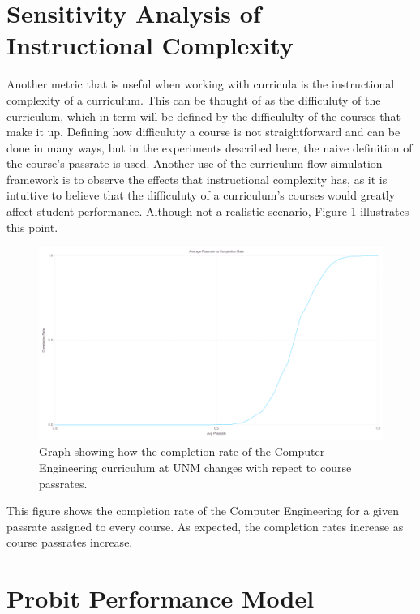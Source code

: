 \documentclass[botnum, fleqn]{unmeethesis}
\begin{document}
\section{Sensitivity Analysis of Instructional Complexity}

Another metric that is useful when working with curricula is the instructional complexity of a curriculum. This can be thought of as the difficuluty of the curriculum, which in term will be defined by the difficululty of the courses that make it up. Defining how difficuluty a course is not straightforward and can be done in many ways, but in the experiments described here, the naive definition of the course's passrate is used. Another use of the curriculum flow simulation framework is to observe the effects that instructional complexity has, as it is intuitive to believe that the difficuluty of a curriculum's courses would greatly affect student performance. Although not a realistic scenario, Figure \ref{fig:instructional} illustrates this point.

\begin{figure}[h!]
\centerline{\includegraphics[scale=0.2]{./figures/instructional.png}}
\caption{Graph showing how the completion rate of the Computer Engineering curriculum at UNM changes with repect to course passrates.} 
\label{fig:instructional}
\end{figure}

This figure shows the completion rate of the Computer Engineering for a given passrate assigned to every course. As expected, the completion rates increase as course passrates increase.

\section{Probit Performance Model}
\end{document}
